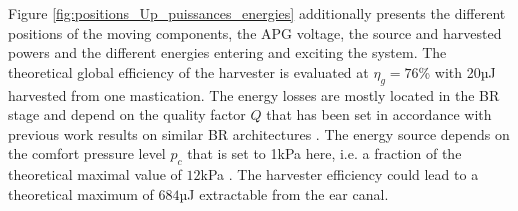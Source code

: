 \documentclass[3p,twocolumn,preprint]{elsarticle}
\begin{document}
Figure \ref{fig:positions_Up_puissances_energies} additionally presents the different positions of the moving components, the APG voltage, the source and harvested powers and the different energies entering and exciting the system. The theoretical global efficiency of the harvester is evaluated at \mbox{$\eta_g=76$\%} with 20µJ harvested from one mastication. The energy losses are mostly located in the BR stage and depend on the quality factor $Q$ that has been set in accordance with previous work results on similar BR architectures \cite{Liu2013}. The energy source depends on the comfort pressure level $p_c$ that is set to 1kPa here, i.e. a fraction of the theoretical maximal value of $12$kPa \cite{Bouchard-Roy2020}. The harvester efficiency could lead to a theoretical maximum of $684$µJ extractable from the ear canal.
\end{document}
